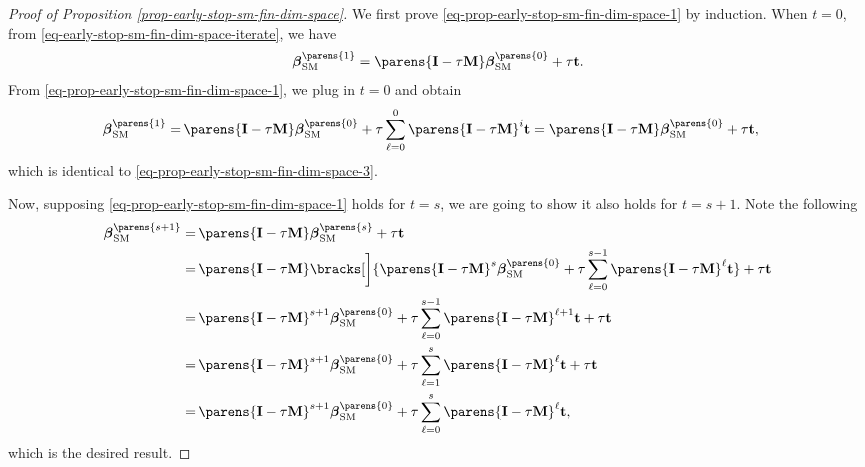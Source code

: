 \begin{proof}[Proof of Proposition \ref{prop-early-stop-sm-fin-dim-space}]
	We first prove \eqref{eq-prop-early-stop-sm-fin-dim-space-1} by induction. When $t = 0$, from \eqref{eq-early-stop-sm-fin-dim-space-iterate}, we have 
	\begin{align}\label{eq-prop-early-stop-sm-fin-dim-space-3}
		\bbeta_{\SM}^{\parens{1}} = \parens{\bI - \tau \bM} \bbeta_{\SM}^{\parens{0}} + \tau \bt. 
	\end{align}
	From \eqref{eq-prop-early-stop-sm-fin-dim-space-1}, we plug in $t=0$ and obtain 
	\begin{align*}
		\bbeta_{\SM}^{\parens{1}} = & \, \parens{\bI - \tau \bM} \bbeta_{\SM}^{\parens{0}} + \tau \sum_{\ell=0}^{0} \parens{\bI - \tau \bM}^i \bt 
		= \parens{\bI - \tau \bM} \bbeta_{\SM}^{\parens{0}} + \tau \bt, 
	\end{align*}
	which is identical to \eqref{eq-prop-early-stop-sm-fin-dim-space-3}. 
	
	Now, supposing \eqref{eq-prop-early-stop-sm-fin-dim-space-1} holds for $t = s$, we are going to show it also holds for $t = s+1$. Note the following 
	\begin{align}
		\bbeta_{\SM}^{\parens{s+1}} = & \, \parens{\bI - \tau \bM} \bbeta_{\SM}^{\parens{s}} + \tau \bt \nonumber \\ 
		= & \, \parens{\bI - \tau \bM} \bracks[\bigg]{\parens{\bI - \tau \bM}^s \bbeta_{\SM}^{\parens{0}} + \tau \sum_{\ell=0}^{s-1} \parens{\bI - \tau \bM}^{\ell} \bt } + \tau \bt \nonumber \\ 
		= & \, \parens{\bI - \tau \bM}^{s+1} \bbeta_{\SM}^{\parens{0}} + \tau \sum_{\ell=0}^{s-1} \parens{\bI - \tau \bM}^{\ell+1} \bt + \tau \bt \nonumber \\ 
		= & \, \parens{\bI - \tau \bM}^{s+1} \bbeta_{\SM}^{\parens{0}} + \tau \sum_{\ell=1}^{s} \parens{\bI - \tau \bM}^{\ell} \bt + \tau \bt \nonumber \\ 
		= & \, \parens{\bI - \tau \bM}^{s+1} \bbeta_{\SM}^{\parens{0}} + \tau \sum_{\ell=0}^{s} \parens{\bI - \tau \bM}^{\ell} \bt, \nonumber
	\end{align}
	which is the desired result. 
	

\end{proof}
